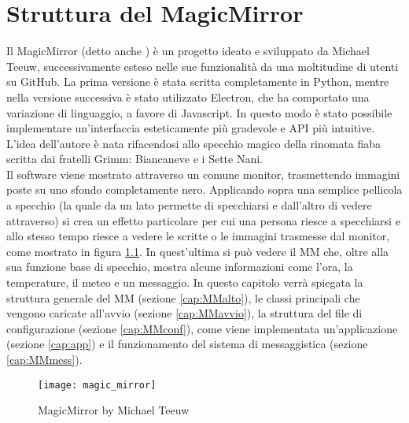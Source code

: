 \chapter{Struttura del MagicMirror}\label{capitolo3}
Il MagicMirror (detto anche ) \`e un progetto ideato e sviluppato da Michael Teeuw, successivamente esteso nelle sue
funzionalit\`a da una moltitudine di utenti su GitHub.
La prima versione \`e stata scritta completamente in Python, mentre nella versione successiva \`e stato utilizzato Electron,
che ha comportato una variazione di linguaggio, a favore di Javascript. In questo modo \`e stato possibile implementare un'interfaccia esteticamente pi\`u gradevole
e API pi\`u intuitive.
L'idea dell'autore \`e nata rifacendosi allo specchio magico della rinomata fiaba
scritta dai fratelli Grimm: Biancaneve e i Sette Nani.\\
Il software viene mostrato attraverso un
comune monitor, trasmettendo immagini poste su uno sfondo completamente nero. Applicando sopra
una semplice pellicola a specchio (la quale da un lato permette di specchiarsi e dall'altro di vedere
attraverso) si crea un effetto particolare per cui una persona riesce a specchiarsi
e allo stesso tempo riesce a vedere le scritte o le immagini trasmesse dal monitor,
come mostrato in figura \ref{fig:MM}. In quest'ultima si pu\`o vedere il MM
che, oltre alla sua funzione base di specchio, mostra alcune informazioni come l'ora, la temperature, il meteo e un messaggio.
In questo capitolo verr\`a spiegata la struttura generale del MM (sezione \ref{cap:MMalto}), le classi principali che vengono caricate
all'avvio (sezione \ref{cap:MMavvio}), la struttura del file di configurazione (sezione \ref{cap:MMconf}),
come viene implementata un'applicazione (sezione \ref{cap:app})
e il funzionamento del sistema di messaggistica (sezione \ref{cap:MMmess}).\\[2\baselineskip]
\begin{figure}[H]
    \texttt{[image: magic\_mirror]}
    \caption{MagicMirror by Michael Teeuw}
    \label{fig:MM}
\end{figure}

